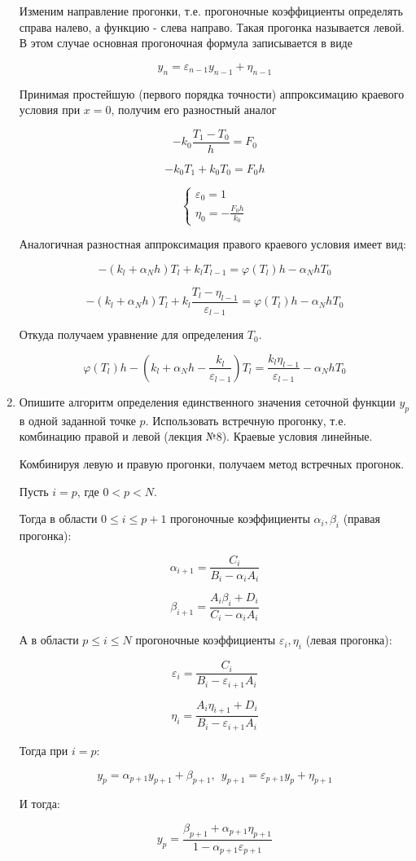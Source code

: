 \documentclass[a4paper,14pt]{extreport} %
\begin{document}
\begin{enumerate}
Изменим направление прогонки, т.е. прогоночные коэффициенты определять справа налево, а функцию - слева направо. Такая прогонка называется левой. В этом случае основная прогоночная формула записывается в виде

$$y_n=\varepsilon_{n-1}y_{n-1}+\eta_{n-1}$$

Принимая простейшую (первого порядка точности) аппроксимацию краевого условия при $x=0$, получим его разностный аналог

$$-k_0\frac{T_1-T_0}{h}=F_0$$

$$-k_0T_1+k_0T_0=F_0h$$

$$
 \begin{cases}
   \varepsilon_0=1
   \\
   \eta_0=-\frac{F_0h}{k_0}
 \end{cases}
$$

Аналогичная разностная аппроксимация правого краевого условия имеет вид:

$$-(k_l+\alpha_Nh)T_{l}+k_lT_{l-1}=\varphi(T_l)h-\alpha_NhT_0$$

$$-(k_l+\alpha_Nh)T_{l}+k_l\frac{T_{l}-\eta_{l-1}}{\varepsilon_{l-1}}=\varphi(T_l)h-\alpha_NhT_0$$

Откуда получаем уравнение для определения $T_0$. 

$$\varphi(T_l)h-(k_l+\alpha_Nh-\frac{k_l}{\varepsilon_{l-1}})T_l=\frac{k_l\eta_{l-1}}{\varepsilon_{l-1}}-\alpha_NhT_0$$

\item Опишите алгоритм определения единственного значения сеточной функции $y_p$ в одной заданной точке $p$. Использовать встречную прогонку, т.е. комбинацию правой и левой (лекция №8). Краевые условия линейные.

Комбинируя левую и правую прогонки, получаем метод встречных прогонок. 

Пусть $i=p$, где $0<p<N$. 

Тогда в области $0\le i \le p+1$ прогоночные коэффициенты $\alpha_i, \beta_i$ (правая прогонка):

$$\alpha_{i+1}=\frac{C_i}{B_i-\alpha_iA_i}$$

$$\beta_{i+1}=\frac{A_i\beta_i+D_i}{C_i-\alpha_iA_i}$$

А в области $p\le i \le N$ прогоночные коэффициенты $\varepsilon_i, \eta_i$ (левая прогонка):

$$\varepsilon_{i}=\frac{C_i}{B_i-\varepsilon_{i+1}A_i}$$

$$\eta_{i}=\frac{A_i\eta_{i+1}+D_i}{B_i-\varepsilon_{i+1}A_i}$$

Тогда при $i=p$:

$$y_p=\alpha_{p+1}y_{p+1}+\beta_{p+1},~~y_{p+1}=\varepsilon_{p+1}y_{p}+\eta_{p+1}$$

И тогда:

$$y_{p}=\frac{\beta_{p+1}+\alpha_{p+1}\eta_{p+1}}{1-\alpha_{p+1}\varepsilon_{p+1}}$$


\end{enumerate}
\end{document}
